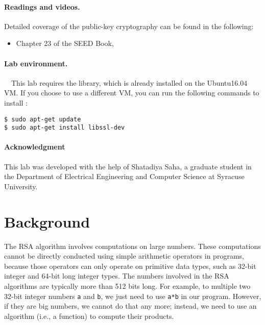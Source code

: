 \paragraph{Readings and videos.}
Detailed coverage of the public-key cryptography can be found in the following:

\begin{itemize}
\item Chapter 23 of the SEED Book, \seedbook
\end{itemize}


\paragraph{Lab environment.} \seedenvironment \ \
This lab requires the \openssl library, which is already
installed on the Ubuntu16.04 VM. If you choose to use 
a different VM, you can run the following commands to install \openssl:

\begin{lstlisting}
$ sudo apt-get update
$ sudo apt-get install libssl-dev
\end{lstlisting}
 

\paragraph{Acknowledgment} This lab was developed with the help of
Shatadiya Saha, a graduate student in the Department of
Electrical Engineering and Computer Science at Syracuse University.




\section{Background}


The RSA algorithm involves computations on large numbers. These computations 
cannot be directly conducted using simple arithmetic operators in programs, because those
operators can only operate on primitive data types, such as 32-bit integer and 64-bit long
integer types. The numbers involved in the RSA algorithms are typically more than 512 bits
long. For example, to multiple two 32-bit integer numbers \texttt{a} and \texttt{b},
we just need to use \texttt{a*b} in our program. However, if they are big numbers, we cannot
do that any more; instead, we need to use an algorithm (i.e., a function) to compute 
their products. 


